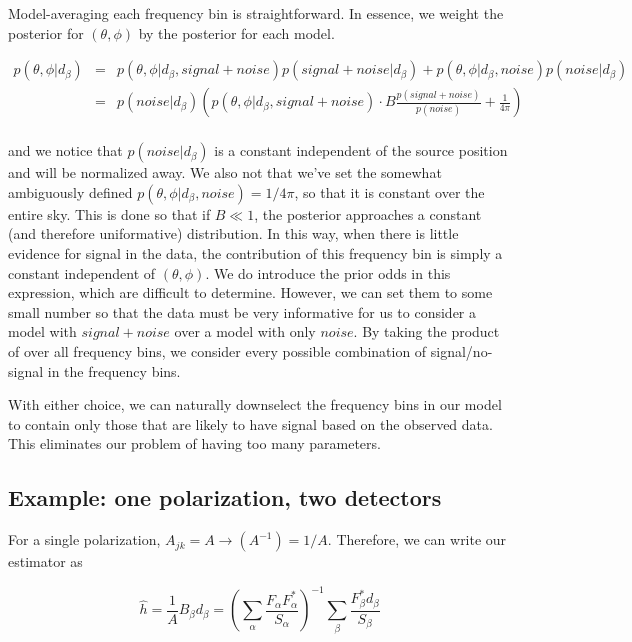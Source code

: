 \documentclass[10pt]{article}
\begin{document}
Model-averaging each frequency bin is straightforward. In essence, we weight the posterior for $(\theta,\phi)$ by the posterior for each model.

\begin{eqnarray}
p(\theta,\phi|d_\beta) & = & p(\theta,\phi|d_\beta,signal+noise)p(signal+noise|d_\beta) + p(\theta,\phi|d_\beta,noise)p(noise|d_\beta) \\
                       & = & p(noise|d_\beta)\left(p(\theta,\phi|d_\beta,signal+noise)\cdot B\frac{p(signal+noise)}{p(noise)} + \frac{1}{4\pi}\right) \\
\end{eqnarray}

and we notice that $p(noise|d_\beta)$ is a constant independent of the source position and will be normalized away. We also not that we've set the somewhat ambiguously defined $p(\theta,\phi|d_\beta,noise)=1/4\pi$, so that it is constant over the entire sky. This is done so that if $B\ll1$, the posterior approaches a constant (and therefore uniformative) distribution. In this way, when there is little evidence for signal in the data, the contribution of this frequency bin is simply a constant independent of $(\theta,\phi)$. We do introduce the prior odds in this expression, which are difficult to determine. However, we can set them to some small number so that the data must be very informative for us to consider a model with $signal+noise$ over a model with only $noise$. By taking the product of over all frequency bins, we consider every possible combination of signal/no-signal in the frequency bins.

With either choice, we can naturally downselect the frequency bins in our model to contain only those that are likely to have signal based on the observed data. This eliminates our problem of having too many parameters.

\subsection{Example: one polarization, two detectors}

For a single polarization, $A_{jk}=A \rightarrow (A^{-1}) = 1/A$. Therefore, we can write our estimator as

\begin{equation}
\hat{h} = \frac{1}{A}B_\beta d_\beta = \left( \sum\limits_{\alpha}\frac{F_\alpha F_\alpha^\ast}{S_\alpha}\right)^{-1} \sum\limits_\beta \frac{F_\beta^\ast d_\beta}{S_\beta}
\end{equation}
\end{document}
